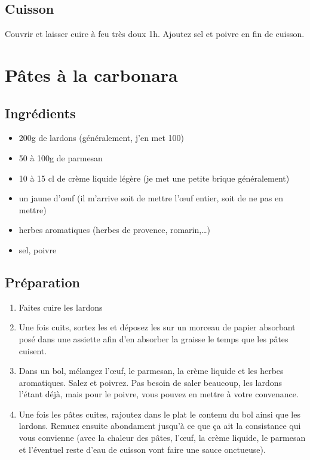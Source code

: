 \subsection*{Cuisson}
Couvrir et laisser cuire à feu très doux 1h. Ajoutez sel et poivre en fin de cuisson.

\newpage
\section{Pâtes à la carbonara}
\subsection*{Ingrédients}
\begin{itemize}
\item 200g de lardons (généralement, j'en met 100)
\item 50 à 100g de parmesan
\item 10 à 15 cl de crème liquide légère (je met une petite brique généralement)
\item un jaune d'œuf (il m'arrive soit de mettre l'œuf entier, soit de ne pas en mettre)
\item herbes aromatiques (herbes de provence, romarin,\dots)
\item sel, poivre
\end{itemize}

\subsection*{Préparation}
\begin{enumerate}
\item Faites cuire les lardons
\item Une fois cuits, sortez les et déposez les sur un morceau de papier absorbant posé dans une assiette afin d'en absorber la graisse le temps que les pâtes cuisent.
\item Dans un bol, mélangez l'œuf, le parmesan, la crème liquide et les herbes aromatiques. Salez et poivrez. Pas besoin de saler beaucoup, les lardons l'étant déjà, mais pour le poivre, vous pouvez en mettre à votre convenance.
\item Une fois les pâtes cuites, rajoutez dans le plat le contenu du bol ainsi que les lardons. Remuez ensuite abondament jusqu'à ce que ça ait la consistance qui vous convienne (avec la chaleur des pâtes, l'œuf, la crème liquide, le parmesan et l'éventuel reste d'eau de cuisson vont faire une sauce onctueuse).
\end{enumerate}

